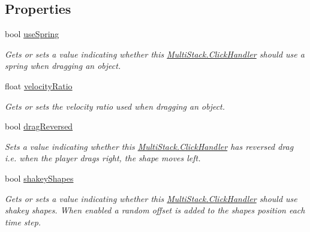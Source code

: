 \subsection*{Properties}
\begin{DoxyCompactItemize}
\item 
bool \hyperlink{class_multi_stack_1_1_click_handler_ae1edbbbc7bc6fb0d73aac34fd5a47b48}{use\+Spring}
\begin{DoxyCompactList}\small\item\em Gets or sets a value indicating whether this \hyperlink{class_multi_stack_1_1_click_handler}{Multi\+Stack.\+Click\+Handler} should use a spring when dragging an object. \end{DoxyCompactList}\item 
float \hyperlink{class_multi_stack_1_1_click_handler_a190adce119045b21706fefa1e0ad2b7b}{velocity\+Ratio}
\begin{DoxyCompactList}\small\item\em Gets or sets the velocity ratio used when dragging an object. \end{DoxyCompactList}\item 
bool \hyperlink{class_multi_stack_1_1_click_handler_a77a3775355cbfd06654ca0740d3200e3}{drag\+Reversed}
\begin{DoxyCompactList}\small\item\em Sets a value indicating whether this \hyperlink{class_multi_stack_1_1_click_handler}{Multi\+Stack.\+Click\+Handler} has reversed drag i.\+e. when the player drags right, the shape moves left. \end{DoxyCompactList}\item 
bool \hyperlink{class_multi_stack_1_1_click_handler_a9088a8092cd9c9525c7024a3e7070c77}{shakey\+Shapes}
\begin{DoxyCompactList}\small\item\em Gets or sets a value indicating whether this \hyperlink{class_multi_stack_1_1_click_handler}{Multi\+Stack.\+Click\+Handler} should use shakey shapes. When enabled a random offset is added to the shapes position each time step. \end{DoxyCompactList}\item 

\end{DoxyCompactItemize}
